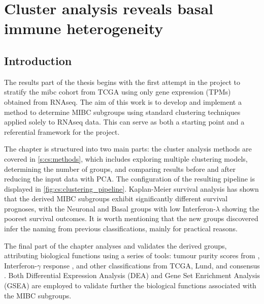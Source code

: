 \chapter{Cluster analysis reveals basal immune heterogeneity} \label{s:clustering_analysis}

\vspace{3mm}
\vspace{3mm}

\section{Introduction}

The results part of the thesis begins with the first attempt in the project to stratify the \acrfull{mibc} cohort from TCGA using only gene expression (TPMs) obtained from RNAseq. The aim of this work is to develop and implement a method to determine MIBC subgroups using standard clustering techniques applied solely to RNAseq data. This can serve as both a starting point and a referential framework for the project.

The chapter is structured into two main parts: the cluster analysis methods are covered in \cref{s:cs:methods}, which includes exploring multiple clustering models, determining the number of groups, and comparing results before and after reducing the input data with PCA. The configuration of the resulting pipeline is displayed in \cref{fig:cs:clustering_pipeline}. Kaplan-Meier survival analysis has shown that the derived MIBC subgroups exhibit significantly different survival prognoses, with the Neuronal and Basal groups with low Interferon-$\lambda$ showing the poorest survival outcomes. It is worth mentioning that the new groups discovered infer the naming from previous classifications, mainly for practical reasons.

The final part of the chapter analyses and validates the derived groups, attributing biological functions using a series of tools: tumour purity scores from \citet{Yoshihara2013-wq}, Interferon-$\gamma$ response \citet{Baker2022-bj}, and other classifications from TCGA, Lund, and consensus \citep{Robertson2017-mg,Marzouka2018-ge,Kamoun2020-tj}. Both Differential Expression Analysis (DEA) and Gene Set Enrichment Analysis (GSEA) are employed to validate further the biological functions associated with the MIBC subgroups.



